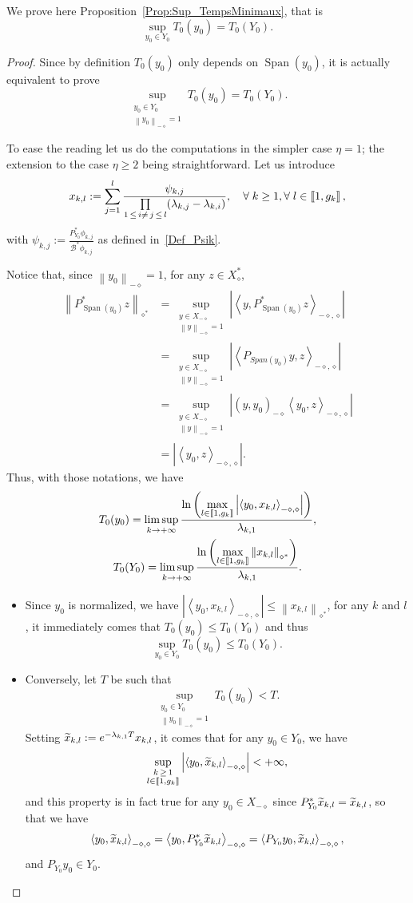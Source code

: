 \documentclass[11pt]{article}
\theoremstyle{definition}
\numberwithin{equation}{section}
\numberwithin{figure}{section}
\numberwithin{table}{section}
\newcommand{\llbracket}{\mathopen{[\mkern -2.7mu[}}
\newcommand{\rrbracket}{\mathclose{]\mkern -2.7mu]}}
\newcommand{\inter}[2]{\llbracket #1,#2 \rrbracket}
\newcommand\Bs{\mathcal{B}^*}
\newcommand{\Xalphas}{X_\diamond^*}
\newcommand{\Xmalpha}{X_{-\diamond}}
\newcommand{\Fzp}{Y_0}
\newcommand{\normeXalphas}[1]{\left\| #1 \right\|_{\diamond^*}}
\newcommand{\normeXmalpha}[1]{\left\| #1 \right\|_{-\diamond}}
\newcommand{\psXmalpha}[2]{\left(#1, #2 \right)_{-\diamond}}
\newcommand{\dual}[2]{\left\langle #1, #2 \right\rangle_{-\diamond,\diamond}}
\newcommand{\PF}{P_{\Fzp}}
\newcommand{\PFa}{P_{\Fzp}^*}
\newcommand{\n}{g}
\DeclareMathOperator{\Span}{Span}
\let\oldtilde\tilde
\renewcommand*{\tilde}[1]{\mathchoice{\widetilde{#1}}{\widetilde{#1}}{\oldtilde{#1}}{\oldtilde{#1}}}\let\oldexists\exists
\renewcommand*{\exists}{\mathrel{\oldexists}}
\let\oldforall\forall
\renewcommand*{\forall}{\mathrel{\oldforall}}
\begin{document}
We prove here Proposition~\ref{Prop:Sup_TempsMinimaux}, that is
\[
\sup_{y_0\in \Fzp} T_{0}(y_0) = T_{0}(\Fzp).
\]
\begin{proof}
Since by definition $T_0(y_0)$ only depends on $\Span(y_0)$, it is actually equivalent to prove
\[
\sup_{\substack{y_0\in \Fzp \\ \normeXmalpha{y_0}=1}} T_{0}(y_0) = T_{0}(\Fzp).
\]

To ease the reading let us do the computations in the simpler case $\eta=1$; the extension to the case $\eta \geq 2$ being straightforward. Let us introduce
\[
x_{k,l} := \sum\limits_{j=1}^l \frac{\psi_{k,j} }{\prod\limits_{1\,\leq\,i \neq\,j\,\leq\,l} (\lambda_{k,j}-\lambda_{k,i})},\quad \forall k\geq 1, \forall l\in \inter{1}{\n_k}\,,
\]
with $\psi_{k,j} := \frac{\PFa \phi_{k,j}}{\Bs \phi_{k,j}}$ as defined in~\eqref{Def_Psik}.



Notice that, since $\normeXmalpha{y_0} =1$, for any $z \in \Xalphas$,
\begin{align*}
\normeXalphas{ P_{\Span(y_0)}^* z } &= \sup\limits_{ \substack{ y \in \Xmalpha \\ \normeXmalpha{y}=1 } } \left| \dual{y}{P_{\Span(y_0)}^*z} \right|
\\
&= \sup\limits_{ \substack{ y \in \Xmalpha \\ \normeXmalpha{y}=1 } } \left| \dual{P_{Span(y_0)}y}{z} \right|
\\
&= \sup\limits_{ \substack{ y \in \Xmalpha \\ \normeXmalpha{y}=1 } } \left| \psXmalpha{y}{y_0} \dual{y_0}{z} \right|
\\
&= \left| \dual{y_0}{z} \right|.
\end{align*}
Thus, with those notations, we have
\begin{gather*}
T_0(y_0) = \limsup_{k\to+\infty} \frac{\ln \left(\max\limits_{l\in \inter{1}{\n_k}} \left| \dual{y_0}{x_{k,l}} \right| \right)}{\lambda_{k,1}},
\\
T_0(\Fzp) = \limsup_{k\to+\infty} \frac{\ln \left(\max\limits_{l\in \inter{1}{\n_k}} \normeXalphas{x_{k,l}} \right)}{\lambda_{k,1}}.
\end{gather*}
\begin{itemize}
\item Since $y_0$ is normalized, we have $\left|\dual{y_0}{x_{k,l}} \right| \leq \normeXalphas{x_{k,l}}$, for any $k$ and $l$, it immediately comes that $T_0(y_0)\leq T_0(\Fzp)$ and thus
\[
\sup_{y_0 \in \Fzp} T_0(y_0) \leq T_0(\Fzp).
\]
\item Conversely, let $T$ be such that
\[
\sup_{\substack{y_0\in \Fzp \\ \normeXmalpha{y_0}=1}} T_0(y_0) < T.
\]
Setting $\tilde{x}_{k,l} := e^{-\lambda_{k,1} T} x_{k,l}$, it comes that for any $y_0 \in \Fzp$, we have
\[
\sup_{\substack{k\,\geq\,1 \\ l\in \inter{1}{\n_k}}} \left| \dual{y_0}{\tilde{x}_{k,l}} \right| < + \infty,
\]
and this property is in fact true for any $y_0\in \Xmalpha$ since $\PFa \tilde{x}_{k,l} = \tilde{x}_{k,l}$, so that we have
\[
\dual{y_0}{\tilde{x}_{k,l}} = \dual{y_0}{\PFa \tilde{x}_{k,l}} = \dual{\PF y_0}{ \tilde{x}_{k,l}},
\]
and $\PF y_0\in \Fzp$.


\end{itemize}
\end{proof}
\end{document}

